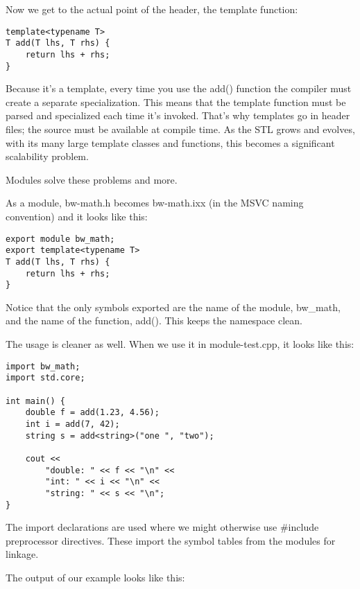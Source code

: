 Now we get to the actual point of the header, the template function:

\begin{lstlisting}[style=styleCXX]
template<typename T>
T add(T lhs, T rhs) {
	return lhs + rhs;
}
\end{lstlisting}

Because it's a template, every time you use the add() function the compiler must create a separate specialization. This means that the template function must be parsed and specialized each time it's invoked. That's why templates go in header files; the source must be available at compile time. As the STL grows and evolves, with its many large template classes and functions, this becomes a significant scalability problem.

Modules solve these problems and more.

As a module, bw-math.h becomes bw-math.ixx (in the MSVC naming convention) and it looks like this:

\begin{lstlisting}[style=styleCXX]
export module bw_math;
export template<typename T>
T add(T lhs, T rhs) {
	return lhs + rhs;
}
\end{lstlisting}

Notice that the only symbols exported are the name of the module, bw\_math, and the name of the function, add(). This keeps the namespace clean.

The usage is cleaner as well. When we use it in module-test.cpp, it looks like this:

\begin{lstlisting}[style=styleCXX]
import bw_math;
import std.core;

int main() {
	double f = add(1.23, 4.56);
	int i = add(7, 42);
	string s = add<string>("one ", "two");
	
	cout <<
		"double: " << f << "\n" <<
		"int: " << i << "\n" <<
		"string: " << s << "\n";
}
\end{lstlisting}

The import declarations are used where we might otherwise use \#include preprocessor directives. These import the symbol tables from the modules for linkage.

The output of our example looks like this:


